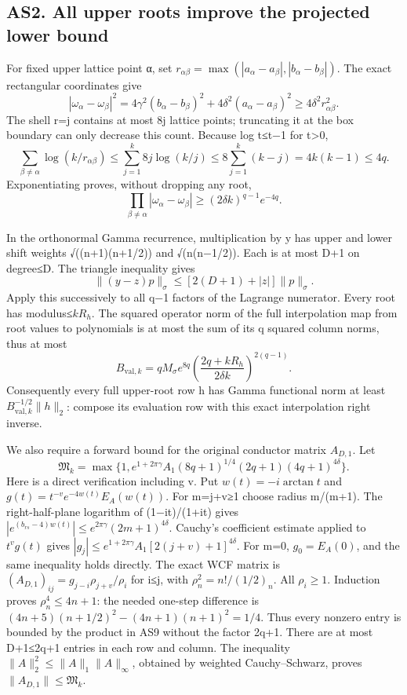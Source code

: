 \documentclass[11pt]{article}
\begin{document}
\subsection{AS2. All upper roots improve the projected lower bound}\label{as2.-all-upper-roots-improve-the-projected-lower-bound}

For fixed upper lattice point α, set \(r_{\alpha\beta}=\max(|a_\alpha-a_\beta|,|b_\alpha-b_\beta|)\). The exact rectangular coordinates give \[
|\omega_\alpha-\omega_\beta|^2
=4\gamma^2(b_\alpha-b_\beta)^2+4\delta^2(a_\alpha-a_\beta)^2
\ge4\delta^2r_{\alpha\beta}^2.
\] The shell r=j contains at most 8j lattice points; truncating it at the box boundary can only decrease this count. Because log t≤t−1 for t\textgreater0, \[
\sum_{\beta\ne\alpha}\log(k/r_{\alpha\beta})
\le\sum_{j=1}^k8j\log(k/j)
\le8\sum_{j=1}^k(k-j)=4k(k-1)\le4q.
\] Exponentiating proves, without dropping any root, \[
\prod_{\beta\ne\alpha}|\omega_\alpha-\omega_\beta|
\ge(2\delta k)^{q-1}e^{-4q}.
\tag{AS6}
\]

In the orthonormal Gamma recurrence, multiplication by y has upper and lower shift weights √((n+1)(n+1/2)) and √(n(n−1/2)). Each is at most D+1 on degree≤D. The triangle inequality gives \[
\|(y-z)p\|_\sigma\le[2(D+1)+|z|]\|p\|_\sigma.
\tag{AS7}
\] Apply this successively to all q−1 factors of the Lagrange numerator. Every root has modulus≤\(kR_h\). The squared operator norm of the full interpolation map from root values to polynomials is at most the sum of its q squared column norms, thus at most \[
B_{\mathrm{val},k}=qM_\sigma e^{8q}
\left(\frac{2q+kR_h}{2\delta k}\right)^{2(q-1)}.
\tag{AS8}
\] Consequently every full upper-root row h has Gamma functional norm at least \(B_{\mathrm{val},k}^{-1/2}\|h\|_2\): compose its evaluation row with this exact interpolation right inverse.

We also require a forward bound for the original conductor matrix \(A_{D,1}\). Let \[
\mathfrak M_k=\max\{1,e^{1+2\pi\gamma}A_1
(8q+1)^{1/4}(2q+1)(4q+1)^{4\delta}\}.
\tag{AS9}
\] Here is a direct verification including v. Put \(w(t)=-i\arctan t\) and \(g(t)=t^{-v}e^{-4w(t)}E_A(w(t))\). For m=j+v≥1 choose radius m/(m+1). The right-half-plane logarithm of (1−it)/(1+it) gives \(|e^{(b_{rs}-4)w(t)}|\le e^{2\pi\gamma}(2m+1)^{4\delta}\). Cauchy's coefficient estimate applied to \(t^vg(t)\) gives \(|g_j|\le e^{1+2\pi\gamma}A_1[2(j+v)+1]^{4\delta}\). For m=0, \(g_0=E_A(0)\), and the same inequality holds directly. The exact WCF matrix is \((A_{D,1})_{ij}=g_{j-i}\rho_{j+v}/\rho_i\) for i≤j, with \(\rho_n^2=n!/(1/2)_n\). All \(\rho_i\ge1\). Induction proves \(\rho_n^4\le4n+1\): the needed one-step difference is \((4n+5)(n+1/2)^2-(4n+1)(n+1)^2=1/4\). Thus every nonzero entry is bounded by the product in AS9 without the factor 2q+1. There are at most D+1≤2q+1 entries in each row and column. The inequality \(\|A\|_2^2\le\|A\|_1\|A\|_\infty\), obtained by weighted Cauchy--Schwarz, proves \(\|A_{D,1}\|\le\mathfrak M_k\).
\end{document}
